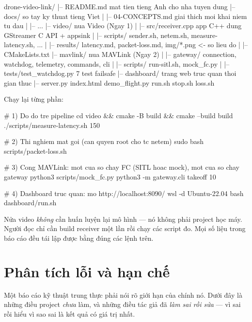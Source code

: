 \documentclass[12pt]{ai_conquer2026}
\begin{document}
\begin{aivnoutputbox}
drone-video-link/
|-- README.md               mat tien tieng Anh cho nha tuyen dung
|-- docs/                   so tay ky thuat tieng Viet
|   |-- 04-CONCEPTS.md       giai thich moi khai niem tu dau
|   |-- ...
|-- video/                  nua Video (Ngay 1)
|   |-- src/receiver.cpp     app C++ dung GStreamer C API + appsink
|   |-- scripts/            sender.sh, netem.sh, measure-latency.sh, ...
|   |-- results/            latency.md, packet-loss.md, img/*.png  <- so lieu do
|   |-- CMakeLists.txt
|-- mavlink/                nua MAVLink (Ngay 2)
|   |-- gateway/            connection, watchdog, telemetry, commands, cli
|   |-- scripts/            run-sitl.sh, mock_fc.py
|   |-- tests/test_watchdog.py   7 test failsafe
|-- dashboard/              trang web truc quan thoi gian thuc
    |-- server.py  index.html  demo_flight.py  run.sh  stop.sh  loss.sh
\end{aivnoutputbox}

Chạy lại từng phần:

\begin{aivncodebox}
\begin{python}
# 1) Do do tre pipeline
cd video && cmake -B build && cmake --build build
./scripts/measure-latency.sh 150

# 2) Thi nghiem mat goi (can quyen root cho tc netem)
sudo bash scripts/packet-loss.sh

# 3) Cong MAVLink: mot cua so chay FC (SITL hoac mock), mot cua so chay gateway
python3 scripts/mock_fc.py
python3 -m gateway.cli takeoff 10

# 4) Dashboard truc quan: mo http://localhost:8090/
wsl -d Ubuntu-22.04 bash dashboard/run.sh
\end{python}
\end{aivncodebox}

Nửa video \emph{không} cần huấn luyện lại mô hình --- nó không phải project học
máy. Người đọc chỉ cần build receiver một lần rồi chạy các script đo. Mọi số liệu
trong báo cáo đều tái lập được bằng đúng các lệnh trên.

\section{Phân tích lỗi và hạn chế}

Một báo cáo kỹ thuật trung thực phải nói rõ giới hạn của chính nó. Dưới đây là
những điều project \emph{chưa} làm, và những điều tác giả đã \emph{làm sai rồi
sửa} --- vì sai rồi hiểu vì sao sai là kết quả có giá trị nhất.
\end{document}
